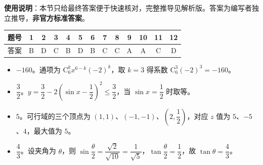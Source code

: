 
\begin{gknotice}
\textbf{使用说明}：本节只给最终答案便于快速核对，完整推导见解析版。答案为编写者独立推导，\textbf{非官方标准答案}。
\end{gknotice}

\begin{center}\begin{tabular}{ccccccccccccc}
\toprule
题号 & 1 & 2 & 3 & 4 & 5 & 6 & 7 & 8 & 9 & 10 & 11 & 12 \\
\midrule
答案 & B & D & C & B & D & B & C & C & A & A & C & D \\
\bottomrule
\end{tabular}\end{center}

\begin{itemize}[leftmargin=2.6em]
  \item[\textbf{13.}] $-160$。通项为 $\mathrm C_6^k x^{6-k}(-2)^k$，取 $k=3$ 得系数 $\mathrm C_6^3(-2)^3=-160$。
  \item[\textbf{14.}] $\dfrac32$。$y=\dfrac32-2\left(\sin x-\dfrac12\right)^2\leqslant\dfrac32$，当 $\sin x=\dfrac12$ 时取等。
  \item[\textbf{15.}] $5$。可行域的三个顶点为 $(1,1)$、$(-1,-1)$、$\left(2,\dfrac12\right)$，对应 $z$ 值为 $5$、$-5$、$4$，最大值为 $5$。
  \item[\textbf{16.}] $\dfrac43$。设夹角为 $\theta$，则 $\sin\dfrac{\theta}{2}=\dfrac{\sqrt2}{\sqrt{10}}=\dfrac1{\sqrt5}$，$\tan\dfrac{\theta}{2}=\dfrac12$，故 $\tan\theta=\dfrac43$。
\end{itemize}


